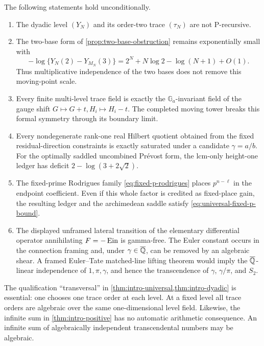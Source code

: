 \begin{theorem}
\label{thm:intro-new-barriers}
The following statements hold unconditionally.
\begin{enumerate}[label=\textup{(\roman*)}]
 \item The dyadic level \((Y_N)\) and its order-two trace \((\tau_N)\) are
 not P-recursive.
 \item The two-base form of \cref{prop:two-base-obstruction} remains
 exponentially small with
 \[
  -\log\{Y_N(2)-Y_{M_N}(3)\}
  =2^N+N\log2-\log(N+1)+O(1).
 \]
 Thus multiplicative independence of the two bases does not remove this
 moving-point scale.
 \item Every finite multi-level trace field is exactly the
 \(\mathbb G_a\)-invariant field of the gauge shift
 \(G\mapsto G+t,H_i\mapsto H_i-t\).  The completed moving tower breaks this
 formal symmetry through its boundary limit.
 \item Every nondegenerate rank-one real Hilbert quotient obtained from the
 fixed residual-direction constraints is exactly saturated under a candidate
 \(\gamma=a/b\).  For the optimally saddled uncombined Pr\'evost form, the
 lcm-only height-one ledger has deficit
 \(2-\log(3+2\sqrt2)\).
 \item The fixed-prime Rodrigues family \eqref{eq:fixed-p-rodrigues}
 places \(p^{n-\ell}\) in the endpoint coefficient.  Even if this whole
 factor is credited as fixed-place gain, the resulting ledger and the
 archimedean saddle satisfy \eqref{eq:universal-fixed-p-bound}.
 \item The displayed unframed lateral transition of the elementary
 differential operator annihilating \(F=-\operatorname{Ein}\) is gamma-free.  The Euler
 constant occurs in the connection framing and, under
 \(\gamma\in\overline{\mathbb Q}\), can be removed by an algebraic shear.  A framed
 Euler--Tate matched-line lifting theorem would imply the
 \(\overline{\mathbb Q}\)-linear independence of \(1,\pi,\gamma\), and hence the
 transcendence of \(\gamma\), \(\gamma/\pi\), and \(S_2\).
\end{enumerate}
\end{theorem}

The qualification ``transversal'' in
\cref{thm:intro-universal,thm:intro-dyadic} is essential: one chooses one
trace order at each level.  At a fixed level all trace orders are algebraic
over the same one-dimensional level field.  Likewise, the infinite sum in
\cref{thm:intro-positive} has no automatic arithmetic consequence.  An
infinite sum of algebraically independent transcendental numbers may be
algebraic.

